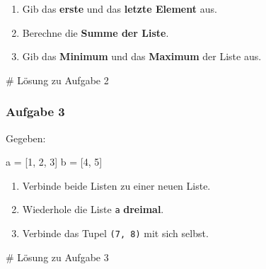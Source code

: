 \documentclass[
  11pt,
  a4paper,
  DIV=11,
  numbers=noendperiod]{scrartcl}
\newenvironment{Shaded}{\begin{snugshade}}{\end{snugshade}}
\newcommand{\CommentTok}[1]{\textcolor[rgb]{0.37,0.37,0.37}{#1}}
\newcommand{\DecValTok}[1]{\textcolor[rgb]{0.68,0.00,0.00}{#1}}
\newcommand{\NormalTok}[1]{\textcolor[rgb]{0.00,0.23,0.31}{#1}}
\newcommand{\OperatorTok}[1]{\textcolor[rgb]{0.37,0.37,0.37}{#1}}
\providecommand{\tightlist}{%
  \setlength{\itemsep}{0pt}\setlength{\parskip}{0pt}}
\begin{document}
\begin{enumerate}
\def\labelenumi{\arabic{enumi}.}
\tightlist
\item
  Gib das \textbf{erste} und das \textbf{letzte Element} aus.\\
\item
  Berechne die \textbf{Summe der Liste}.\\
\item
  Gib das \textbf{Minimum} und das \textbf{Maximum} der Liste aus.
\end{enumerate}

\begin{Shaded}
\begin{Highlighting}[numbers=left,,]
\CommentTok{\# Lösung zu Aufgabe 2}
\end{Highlighting}
\end{Shaded}

\subsubsection{Aufgabe 3}\label{aufgabe-3}

Gegeben:

\begin{Shaded}
\begin{Highlighting}[numbers=left,,]
\NormalTok{a }\OperatorTok{=}\NormalTok{ [}\DecValTok{1}\NormalTok{, }\DecValTok{2}\NormalTok{, }\DecValTok{3}\NormalTok{]}
\NormalTok{b }\OperatorTok{=}\NormalTok{ [}\DecValTok{4}\NormalTok{, }\DecValTok{5}\NormalTok{]}
\end{Highlighting}
\end{Shaded}

\begin{enumerate}
\def\labelenumi{\arabic{enumi}.}
\tightlist
\item
  Verbinde beide Listen zu einer neuen Liste.\\
\item
  Wiederhole die Liste \texttt{a} \textbf{dreimal}.\\
\item
  Verbinde das Tupel \texttt{(7,\ 8)} mit sich selbst.
\end{enumerate}

\begin{Shaded}
\begin{Highlighting}[numbers=left,,]
\CommentTok{\# Lösung zu Aufgabe 3}
\end{Highlighting}
\end{Shaded}
\end{document}
